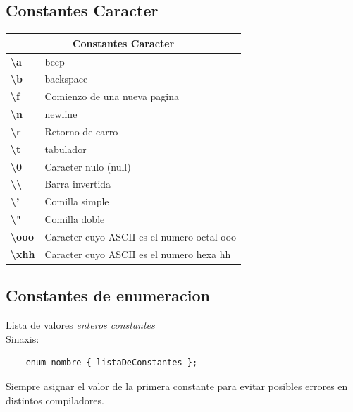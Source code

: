 \documentclass{article}
\begin{document}
\subsection{Constantes Caracter}
\begin{table}[H]\centering
    \begin{tabular}{|l|l|}
    \hline
    \multicolumn{2}{|c|}{\cellcolor[HTML]{C0C0C0}\textbf{Constantes Caracter}}             \\ \hline
    \textbf{\textbackslash{}a}                & beep                                       \\ \hline
    \textbf{\textbackslash{}b}                & backspace                                  \\ \hline
    \textbf{\textbackslash{}f}                & Comienzo de una nueva pagina               \\ \hline
    \textbf{\textbackslash{}n}                & newline                                    \\ \hline
    \textbf{\textbackslash{}r}                & Retorno de carro                           \\ \hline
    \textbf{\textbackslash{}t}                & tabulador                                  \\ \hline
    \textbf{\textbackslash{}0}                & Caracter nulo (null)                       \\ \hline
    \textbf{\textbackslash{}\textbackslash{}} & Barra invertida                            \\ \hline
    \textbf{\textbackslash{}'}                & Comilla simple                             \\ \hline
    \textbf{\textbackslash{}"}                & Comilla doble                              \\ \hline
    \textbf{\textbackslash{}ooo}              & Caracter cuyo ASCII es el numero octal ooo \\ \hline
    \textbf{\textbackslash{}xhh}              & Caracter cuyo ASCII es el numero hexa hh   \\ \hline
    \end{tabular}
    \end{table}

\subsection{Constantes de enumeracion}
Lista de valores \emph{enteros constantes}
\\\underline{Sinaxis}:
\begin{lstlisting}
    enum nombre { listaDeConstantes };
\end{lstlisting}
Siempre asignar el valor de la primera constante para evitar posibles errores en distintos compiladores.
\end{document}
